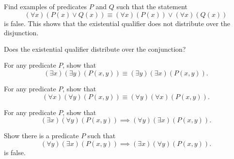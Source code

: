 \documentclass[12pt,fleqn,answers]{exam}
\begin{document}
\begin{questions}
\begin{parts}
\end{parts}

\question Find examples of predicates $P$ and $Q$ such
that the statement
\begin{equation*}
  \left(\forall x \right) \left(P(x) \lor Q(x) \right) \equiv
    \left(\forall x \right) (P(x)) \lor 
    \left(\forall x \right) (Q(x))
\end{equation*}
is false. This shows that the existential qualifier does not 
distribute over the disjunction.

\question Does the existential qualifier distribute over the 
conjunction?

\question For any predicate $P$, show that
\begin{equation*}
  \left(\exists x\right)
  \left(\exists y \right)
  \left(P(x,y)\right) \equiv
  \left(\exists y \right)
  \left(\exists x \right)
  \left(P(x,y)\right).
\end{equation*}

\question For any predicate $P$, show that
\begin{equation*}
  \left(\forall x\right)
  \left(\forall y \right)
  \left(P(x,y)\right) \equiv
  \left(\forall y \right)
  \left(\forall x \right)
  \left(P(x,y)\right).
\end{equation*}


\question For any predicate $P$, show that
\begin{equation*}
    \left(\exists x\right)
    \left(\forall y \right)
    \left(P(x,y)\right) \implies 
    \left(\forall y \right)
    \left(\exists x \right)
    \left(P(x,y)\right).
  \end{equation*}

  \question Show there is a predicate $P$ such that 
  \begin{equation*}
    \left(\forall y \right)
    \left(\exists x \right)
    \left(P(x,y)\right) \implies 
      \left(\exists x\right)
      \left(\forall y \right)
      \left(P(x,y)\right).
\end{equation*}
is false.
  


\end{questions}
\end{document}
